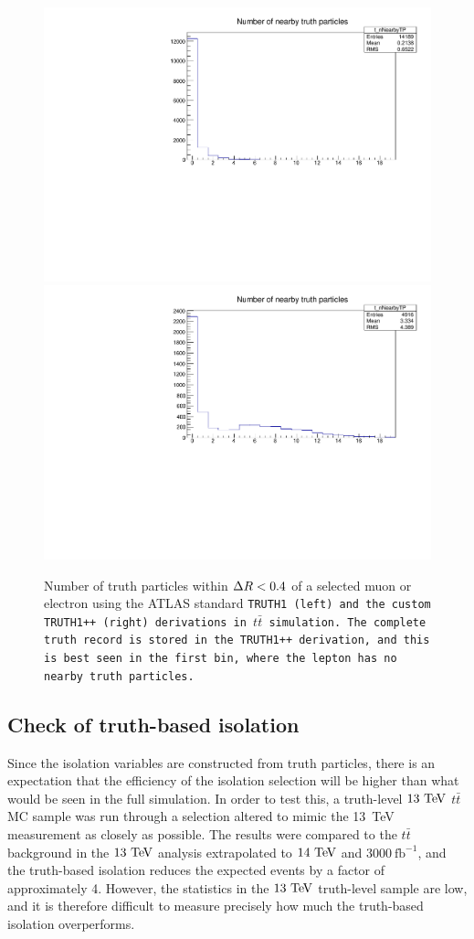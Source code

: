 \begin{figure}[htbp]
  \centering
  \includegraphics[width=.48\textwidth]{figs/ssww_upgrade/isolation/truth1_nearbytp}
  \includegraphics[width=.48\textwidth]{figs/ssww_upgrade/isolation/truth1pp_nearbytp}
  \caption{Number of truth particles within $\Delta R < 0.4$ of a selected muon or electron using the ATLAS standard \tt{TRUTH1} (left) and the custom \tt{TRUTH1++} (right) derivations in $t\bar{t}$ simulation. The complete truth record is stored in the \tt{TRUTH1++} derivation, and this is best seen in the first bin, where the lepton has no nearby truth particles.}
  \label{fig:truth_iso_truth1}
\end{figure}
\FloatBarrier

\subsection{Check of truth-based isolation}
Since the isolation variables are constructed from truth particles, there is an expectation that the efficiency of the isolation selection will be higher than what would be seen in the full simulation.
In order to test this, a truth-level $13\tev$ $t\bar{t}$ MC sample was run through a selection altered to mimic the 13~TeV \ssww measurement as closely as possible.
The results were compared to the $t\bar{t}$ background in the $13\tev$ analysis extrapolated to $14\tev$ and $3000~\textrm{fb}^{-1}$, and the truth-based isolation reduces the expected events by a factor of approximately 4.
However, the statistics in the $13\tev$ truth-level sample are low, and it is therefore difficult to measure precisely how much the truth-based isolation overperforms.

